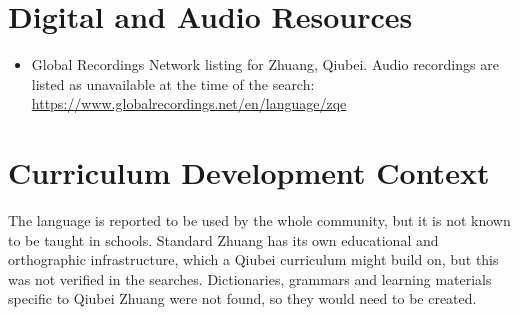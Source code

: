 \documentclass[12pt]{article}
\begin{document}
\section{Digital and Audio Resources}
\begin{itemize}
\item Global Recordings Network listing for Zhuang, Qiubei. Audio recordings are listed as unavailable at the time of the search: \url{https://www.globalrecordings.net/en/language/zqe}
\end{itemize}

\section{Curriculum Development Context}
The language is reported to be used by the whole community, but it is not known to be taught in schools. Standard Zhuang has its own educational and orthographic infrastructure, which a Qiubei curriculum might build on, but this was not verified in the searches. Dictionaries, grammars and learning materials specific to Qiubei Zhuang were not found, so they would need to be created.
\end{document}
